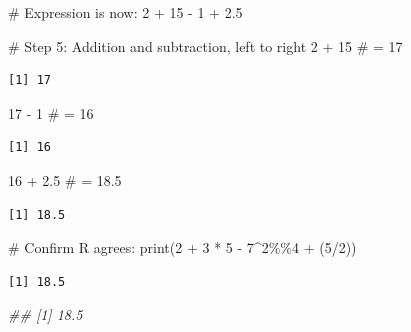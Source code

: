 \documentclass[
  letterpaper,
  DIV=11,
  numbers=noendperiod]{scrreprt}
\newenvironment{Shaded}{\begin{snugshade}}{\end{snugshade}}
\newcommand{\CommentTok}[1]{\textcolor[rgb]{0.37,0.37,0.37}{#1}}
\newcommand{\DecValTok}[1]{\textcolor[rgb]{0.68,0.00,0.00}{#1}}
\newcommand{\DocumentationTok}[1]{\textcolor[rgb]{0.37,0.37,0.37}{\textit{#1}}}
\newcommand{\FloatTok}[1]{\textcolor[rgb]{0.68,0.00,0.00}{#1}}
\newcommand{\FunctionTok}[1]{\textcolor[rgb]{0.28,0.35,0.67}{#1}}
\newcommand{\NormalTok}[1]{\textcolor[rgb]{0.00,0.23,0.31}{#1}}
\newcommand{\SpecialCharTok}[1]{\textcolor[rgb]{0.37,0.37,0.37}{#1}}
\begin{document}
\begin{Shaded}
\begin{Highlighting}[]
\CommentTok{\# Expression is now: 2 + 15 {-} 1 + 2.5}

\CommentTok{\# Step 5: Addition and subtraction, left to right}
\DecValTok{2} \SpecialCharTok{+} \DecValTok{15}  \CommentTok{\# = 17}
\end{Highlighting}
\end{Shaded}

\begin{verbatim}
[1] 17
\end{verbatim}

\begin{Shaded}
\begin{Highlighting}[]
\DecValTok{17} \SpecialCharTok{{-}} \DecValTok{1}  \CommentTok{\# = 16}
\end{Highlighting}
\end{Shaded}

\begin{verbatim}
[1] 16
\end{verbatim}

\begin{Shaded}
\begin{Highlighting}[]
\DecValTok{16} \SpecialCharTok{+} \FloatTok{2.5}  \CommentTok{\# = 18.5}
\end{Highlighting}
\end{Shaded}

\begin{verbatim}
[1] 18.5
\end{verbatim}

\begin{Shaded}
\begin{Highlighting}[]
\CommentTok{\# Confirm R agrees:}
\FunctionTok{print}\NormalTok{(}\DecValTok{2} \SpecialCharTok{+} \DecValTok{3} \SpecialCharTok{*} \DecValTok{5} \SpecialCharTok{{-}} \DecValTok{7}\SpecialCharTok{\^{}}\DecValTok{2}\SpecialCharTok{\%\%}\DecValTok{4} \SpecialCharTok{+}\NormalTok{ (}\DecValTok{5}\SpecialCharTok{/}\DecValTok{2}\NormalTok{))}
\end{Highlighting}
\end{Shaded}

\begin{verbatim}
[1] 18.5
\end{verbatim}

\begin{Shaded}
\begin{Highlighting}[]
\DocumentationTok{\#\# [1] 18.5}
\end{Highlighting}
\end{Shaded}
\end{document}

